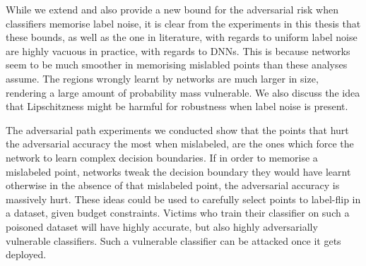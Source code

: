 \documentclass{ociamthesis}
\begin{document}
While we extend and also provide a new bound for the adversarial risk when
classifiers memorise label noise, it is clear from the experiments in this
thesis that these bounds, as well as the one in literature, with regards to
uniform label noise are highly vacuous in practice, with regards to DNNs. This
is because networks seem to be much smoother in memorising mislabled points than
these analyses assume. The regions wrongly learnt by networks are much larger in
size, rendering a large amount of probability mass vulnerable. We also discuss
the idea that Lipschitzness might be harmful for robustness when label noise is
present.

The adversarial path experiments we conducted show that the points that hurt the
adversarial accuracy the most when mislabeled, are the ones which force the
network to learn complex decision boundaries. If in order to memorise a
mislabeled point, networks tweak the decision boundary they would have learnt
otherwise in the absence of that mislabeled point, the adversarial accuracy is
massively hurt. These ideas could be used to carefully select points to
label-flip in a dataset, given budget constraints. Victims who train their
classifier on such a poisoned dataset will have highly accurate, but also highly
adversarially vulnerable classifiers. Such a vulnerable classifier can be
attacked once it gets deployed.


\clearpage


\end{document}
